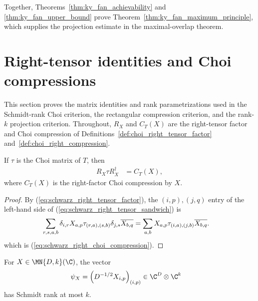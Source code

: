 Together, Theorems~\ref{thm:ky_fan_achievability} and
\ref{thm:ky_fan_upper_bound} prove Theorem~\ref{thm:ky_fan_maximum_principle},
which supplies the projection estimate in the maximal-overlap theorem.

\section{Right-tensor identities and Choi compressions}
\label{sec:app_positive_not_cp_choi_compression}

This section proves the matrix identities and rank parametrizations used in
the Schmidt-rank Choi criterion, the rectangular compression criterion, and
the rank-$k$ projection criterion. Throughout, $R_X$ and $C_T(X)$ are the
right-tensor factor and Choi compression of
Definitions~\ref{def:choi_right_tensor_factor}
and~\ref{def:choi_right_compression}.

\begin{theorem}
    \label{thm:choi_right_tensor_sandwich}
    \leanok
    If $\tau$ is the Choi matrix of $T$, then
    \begin{align}
        R_X\tau R_X^\dagger
         & =C_T(X),
        \label{eq:schwarz_right_tensor_sandwich}
    \end{align}
    where $C_T(X)$ is the right-factor Choi compression by $X$.
\end{theorem}

\begin{proof}
    \leanok
    By (\ref{eq:schwarz_right_tensor_factor}), the $(i,p),(j,q)$ entry of the
    left-hand side of (\ref{eq:schwarz_right_tensor_sandwich}) is
    \begin{align}
        \sum_{r,s,a,b}
        \delta_{i,r}X_{a,p}\tau_{(r,a),(s,b)}
        \delta_{j,s}\overline{X_{b,q}}
         & =\sum_{a,b}X_{a,p}\tau_{(i,a),(j,b)}
        \overline{X_{b,q}}.
        \notag
    \end{align}
    which is (\ref{eq:schwarz_right_choi_compression}).
\end{proof}

\begin{lemma}
    \label{lem:compressed_omega_schmidt_rank}
    \leanok
    For $X\in\MN{D,k}(\C)$, the vector
    \begin{align}
        \psi_X
         & =\left(D^{-1/2}X_{i,p}\right)_{(i,p)}
        \in\C^D\otimes\C^k
        \label{eq:schwarz_compressed_omega}
    \end{align}
    has Schmidt rank at most $k$.
\end{lemma}

